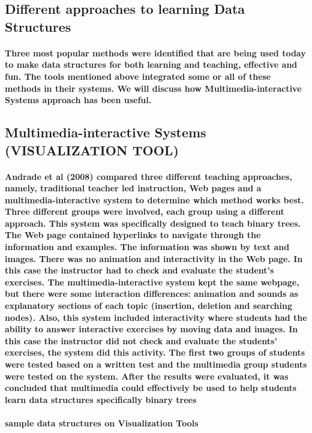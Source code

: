 \documentclass{article}
\begin{document}
\subsection{Different approaches to learning Data Structures }

\paragraph{Three most popular methods were identified that are being used today to make data structures for both learning and teaching, effective and fun. The tools mentioned above integrated some or all of these methods in their systems. We will discuss how Multimedia-interactive Systems approach has been useful.}

\subsection{Multimedia-interactive Systems (VISUALIZATION TOOL)}

\paragraph{\cite{ladegaardconference}Andrade et al (2008) compared three different teaching approaches, namely, traditional teacher led instruction, Web pages and a multimedia-interactive system to determine which method works best. Three different groups were involved, each group using a different approach. This system was specifically designed to teach binary trees. The Web page contained hyperlinks to navigate through the information and examples. The information was shown by text and images. There was no animation and interactivity in the Web page. In this case the instructor had to check and evaluate the student's exercises. The multimedia-interactive system kept the same webpage, but there were some interaction differences: animation and sounds as explanatory sections of each topic (insertion, deletion and searching nodes). Also, this system included interactivity where students had the ability to answer interactive exercises by moving data and images. In this case the instructor did not check and evaluate the students' exercises, the system did this activity. The first two groups of students were tested based on a written test and the multimedia group students were tested on the system. After the results were evaluated, it was concluded that multimedia could effectively be used to help students learn data structures specifically binary trees}
\paragraph{sample data structures on Visualization Tools}
\end{document}
